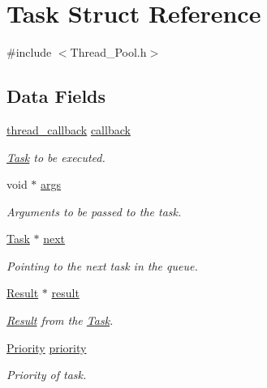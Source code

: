 \hypertarget{struct_task}{}\section{Task Struct Reference}
\label{struct_task}


{\ttfamily \#include $<$Thread\+\_\+\+Pool.\+h$>$}

\subsection*{Data Fields}
\begin{DoxyCompactItemize}
\item 
\hyperlink{_thread___pool_8h_a6020f0ebe47b326c900080b168c40b53}{thread\+\_\+callback} \hyperlink{struct_task_a59d2df9ef30fbe9c225b6422f2dfa07d}{callback}
\begin{DoxyCompactList}\small\item\em \hyperlink{struct_task}{Task} to be executed. \end{DoxyCompactList}\item 
void $\ast$ \hyperlink{struct_task_add0eb34e0cef9e763462cf9080f9be0a}{args}
\begin{DoxyCompactList}\small\item\em Arguments to be passed to the task. \end{DoxyCompactList}\item 
\hyperlink{struct_task}{Task} $\ast$ \hyperlink{struct_task_afc791d22abed6d81e714bb3993c31223}{next}
\begin{DoxyCompactList}\small\item\em Pointing to the next task in the queue. \end{DoxyCompactList}\item 
\hyperlink{struct_result}{Result} $\ast$ \hyperlink{struct_task_a47963d2c7f557db21790fb71b8cd20d6}{result}
\begin{DoxyCompactList}\small\item\em \hyperlink{struct_result}{Result} from the \hyperlink{struct_task}{Task}. \end{DoxyCompactList}\item 
\hyperlink{_thread___pool_8h_a315655b1bb5848c063491adffde62b15}{Priority} \hyperlink{struct_task_a417d879c9e171360ff9bcaef858fef6a}{priority}
\begin{DoxyCompactList}\small\item\em Priority of task. \end{DoxyCompactList}\item 

\end{DoxyCompactItemize}
